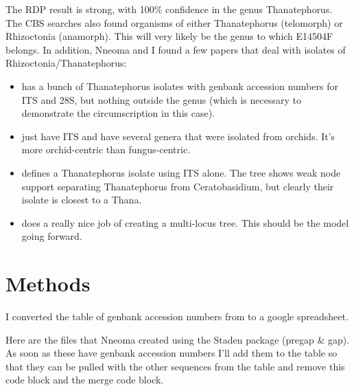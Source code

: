 \documentclass[11pt,]{article}
\providecommand{\tightlist}{%
  \setlength{\itemsep}{0pt}\setlength{\parskip}{0pt}}
\begin{document}
The RDP result is strong, with 100\% confidence in the genus
Thanatephorus. The CBS searches also found organisms of either
Thanatephorus (telomorph) or Rhizoctonia (anamorph). This will very
likely be the genus to which E14504F belongs. In addition, Nneoma and I
found a few papers that deal with isolates of Rhizoctonia/Thanatephorus:

\begin{itemize}
\tightlist
\item
  \citep{gonzalez_ribosomal_2001} has a bunch of Thanatephorus isolates
  with genbank accession numbers for ITS and 28S, but nothing outside
  the genus (which is necessary to demonstrate the circumscription in
  this case).
\item
  \citep{tupac_otero_diversity_2002} just have ITS and have several
  genera that were isolated from orchids. It's more orchid-centric than
  fungus-centric.
\item
  \citep{lopez-chavez_proteomic_2016} defines a Thanatephorus isolate
  using ITS alone. The tree shows weak node support separating
  Thanatephorus from Ceratobasidium, but clearly their isolate is
  closest to a Thana.
\item
  \citep{gonzalez_phylogenetic_2016} does a really nice job of creating
  a multi-locus tree. This should be the model going forward.
\end{itemize}

\section{Methods}\label{methods}

I converted the table of genbank accession numbers from
\citep{gonzalez_phylogenetic_2016} to a google spreadsheet.

Here are the files that Nneoma created using the Staden package (pregap
\& gap). As soon as these have genbank accession numbers I'll add them
to the table so that they can be pulled with the other sequences from
the table and remove this code block and the merge code block.
\end{document}
